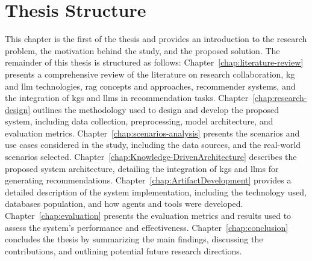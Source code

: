 \section{Thesis Structure}\label{sec:thesis-structure}
This chapter is the first of the thesis and provides an introduction to the research problem, the motivation behind the study, and the proposed solution.
The remainder of this thesis is structured as follows: Chapter~\ref{chap:literature-review} presents a comprehensive review of the literature on research collaboration, \gls{kg} and \gls{llm} technologies, \gls{rag} concepts and approaches, recommender systems, and the integration of \glspl{kg} and \glspl{llm} in recommendation tasks.
Chapter~\ref{chap:research-design} outlines the methodology used to design and develop the proposed system, including data collection, preprocessing, model architecture, and evaluation metrics.
Chapter~\ref{chap:scenarios-analysis} presents the scenarios and use cases considered in the study, including the data sources, and the real-world scenarios selected.
Chapter~\ref{chap:Knowledge-DrivenArchitecture} describes the proposed system architecture, detailing the integration of \glspl{kg} and \glspl{llm} for generating recommendations.
Chapter~\ref{chap:ArtifactDevelopment} provides a detailed description of the system implementation, including the technology used, databases population, and how agents and tools were developed.
Chapter~\ref{chap:evaluation} presents the evaluation metrics and results used to assess the system's performance and effectiveness.
Chapter~\ref{chap:conclusion} concludes the thesis by summarizing the main findings, discussing the contributions, and outlining potential future research directions.
%